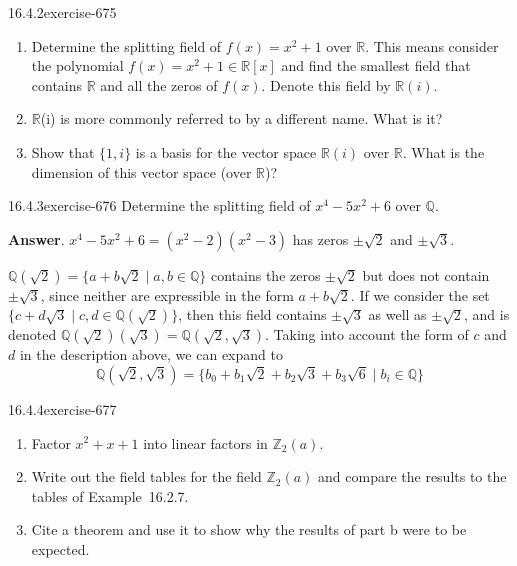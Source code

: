 \documentclass[twoside,10pt,]{book}
\numberwithin{equation}{section}
\begin{document}
\begin{divisionsolution}{16.4.2}{}{exercise-675}%
\hypertarget{p-6036}{}%
\leavevmode%
\begin{enumerate}[label=(\alph*)]
\item\hypertarget{li-2669}{}\hypertarget{p-6037}{}%
Determine the splitting field of \(f(x) = x^2+ 1\) over \(\mathbb{R}\). This means consider the polynomial \(f(x) = x^2+1 \in  \mathbb{R}[x]\) and find the smallest field that contains \(\mathbb{R}\) and all the zeros of \(f(x)\).  Denote this field by \(\mathbb{R}(i)\).%
\item\hypertarget{li-2670}{}\hypertarget{p-6038}{}%
\(\mathbb{R}\)(i) is more commonly referred to by a different name. What is it?%
\item\hypertarget{li-2671}{}\hypertarget{p-6039}{}%
Show that \(\{1, i\}\) is a basis for the vector space \(\mathbb{R}(i)\) over \(\mathbb{R}\). What is the dimension of this vector space (over \(\mathbb{R}\))?%
\end{enumerate}
%
\end{divisionsolution}%
\begin{divisionsolution}{16.4.3}{}{exercise-676}%
\hypertarget{p-6040}{}%
Determine the splitting field of \(x^4 - 5x^2 + 6\) over \(\mathbb{Q}\).%
\par\smallskip%
\noindent\textbf{Answer}.\quad%
\hypertarget{p-6041}{}%
\(x^4 - 5x^2 +6 = (x^2 - 2)(x^2 - 3)\) has zeros \(\pm \sqrt{2}\) and \(\pm \sqrt{3}\).%
\par
\hypertarget{p-6042}{}%
\(\mathbb{Q}(\sqrt{2}) = \{a + b\sqrt{2} \mid a, b \in \mathbb{Q}\}\) contains the zeros \(\pm \sqrt{2}\) but does not contain \(\pm \sqrt{3}\), since neither are expressible in the form \(a + b\sqrt{2}\). If we consider the set \(\{c + d\sqrt{3} \mid c,d \in  \mathbb{Q}(\sqrt{2})\}\), then this field contains \(\pm \sqrt{3}\) as well as \(\pm \sqrt{2}\), and is denoted  \(\mathbb{Q}(\sqrt{2})(\sqrt{3})= \mathbb{Q}(\sqrt{2}, \sqrt{3})\).  Taking into account the form of \(c\) and \(d\) in the description above, we can expand to%
\begin{equation*}
\mathbb{Q}(\sqrt{2},\sqrt{3})= \{b_0 + b_1\sqrt{2} + b_2 \sqrt{3} +b_3\sqrt{6}  \mid  b_i \in \mathbb{Q}\}
\end{equation*}
%
\end{divisionsolution}%
\begin{divisionsolution}{16.4.4}{}{exercise-677}%
\hypertarget{p-6043}{}%
\leavevmode%
\begin{enumerate}[label=(\alph*)]
\item\hypertarget{li-2672}{}\hypertarget{p-6044}{}%
Factor \(x^2 + x + 1\) into linear factors in \(\mathbb{Z}_2(a)\).%
\item\hypertarget{li-2673}{}\hypertarget{p-6045}{}%
Write out the field tables for the field \(\mathbb{Z}_2(a)\) and compare the results to the tables of Example~16.2.7.%
\item\hypertarget{li-2674}{}\hypertarget{p-6046}{}%
Cite a theorem and use it to show why the results of part b were to be expected.%
\end{enumerate}
%
\end{divisionsolution}%
\end{document}
